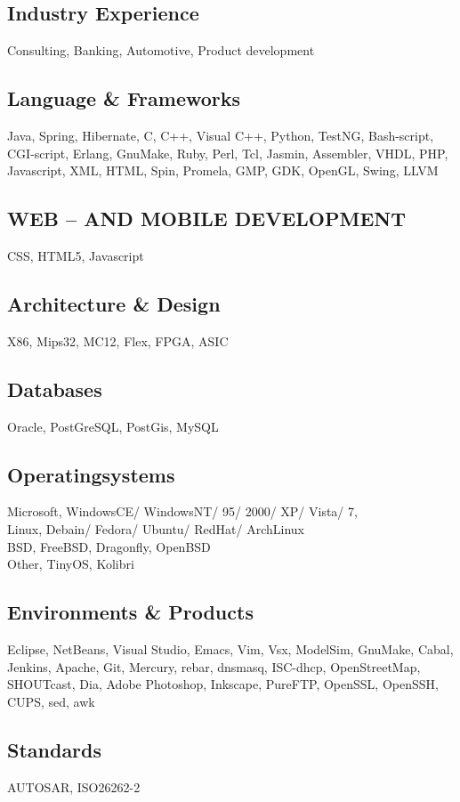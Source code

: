 \documentclass[fontsize=10pt]{tccv}
\begin{document}
\subsection{Industry Experience}
Consulting,
Banking,
Automotive,
Product development

\subsection{Language \& Frameworks}
Java, Spring, Hibernate, C, C++, Visual C++, Python, TestNG, Bash-script, CGI-script, Erlang, GnuMake, Ruby, Perl, Tcl, Jasmin, Assembler, VHDL, PHP, Javascript, XML, HTML, Spin, Promela, GMP, GDK, OpenGL, Swing, LLVM
\subsection{WEB – AND MOBILE DEVELOPMENT}
        CSS, HTML5, Javascript


\subsection{Architecture \& Design}
X86, Mips32, MC12, Flex, FPGA, ASIC

\subsection{Databases}
Oracle, PostGreSQL, PostGis, MySQL

\subsection{Operatingsystems}
Microsoft, WindowsCE/ WindowsNT/ 95/ 2000/ XP/ Vista/ 7,
\\
Linux, Debain/ Fedora/ Ubuntu/ RedHat/ ArchLinux
\\
BSD, FreeBSD, Dragonfly, OpenBSD
\\
Other, TinyOS, Kolibri

\subsection{Environments \& Products}
Eclipse, NetBeans, Visual Studio, Emacs, Vim, Vsx, ModelSim, GnuMake, Cabal,
Jenkins, Apache, Git, Mercury, rebar, dnsmasq, ISC-dhcp, OpenStreetMap,
SHOUTcast, Dia, Adobe Photoshop, Inkscape, PureFTP, OpenSSL, OpenSSH, CUPS,
sed, awk

\subsection{Standards}
AUTOSAR, ISO26262-2
\end{document}
